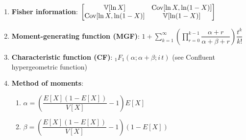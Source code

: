 \begin{enumerate}
    \item \textbf{Fisher information}: $  {\displaystyle {\begin{bmatrix}\mathbb{V}[\ln X]&\text{Cov}[\ln X,\ln(1-X)]\\\text{Cov}[\ln X,\ln(1-X)]&\mathbb{V}[\ln(1-X)]\end{bmatrix}}} $
    \hfill \cite{wiki/Beta_distribution}


    \item \textbf{Moment-generating function (MGF)}: $   {\displaystyle 1+\sum _{k=1}^{\infty }\left(\prod _{r=0}^{k-1}{\dfrac {\alpha +r}{\alpha +\beta +r}}\right){\dfrac {t^{k}}{k!}}} $
    \hfill \cite{wiki/Beta_distribution}

    \item \textbf{Characteristic function (CF)}:
    $   {\displaystyle {}_{1}F_{1}(\alpha ;\alpha +\beta ;i\,t)\!}  $
    (see Confluent hypergeometric function)
    \hfill \cite{wiki/Beta_distribution}



    \item \textbf{Method of moments}:
    \begin{enumerate}
        \item $  {\displaystyle \alpha =\left({\dfrac {E[X](1-E[X])}{V[X]}}-1\right)E[X]} $
        \hfill \cite{wiki/Beta_distribution}

        \item $  {\displaystyle \beta =\left({\dfrac {E[X](1-E[X])}{V[X]}}-1\right)(1-E[X])} $
        \hfill \cite{wiki/Beta_distribution}
    \end{enumerate}
\end{enumerate}




